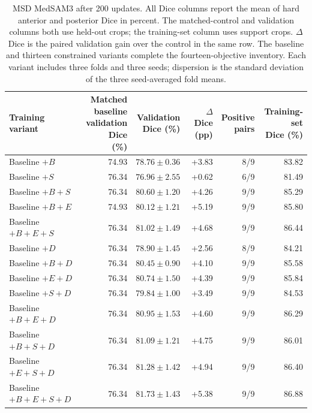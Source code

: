 \documentclass[12pt,a4paper]{article}
\begin{document}
\FloatBarrier
\begin{table}[htbp]
\centering\footnotesize{}
\setlength{\tabcolsep}{4pt}
\renewcommand{\arraystretch}{1.15}
\begin{tabular}{@{}lrrrrr@{}}
\hline
\shortstack{Training\\variant} & \shortstack{Matched baseline\\validation Dice\\(\%)} & \shortstack{Validation\\Dice (\%)} & \shortstack{$\Delta$ Dice\\(pp)} & \shortstack{Positive\\pairs} & \shortstack{Training-set\\Dice (\%)} \\
\hline
Baseline $+B$ & 74.93 & $78.76\pm0.36$ & +3.83 & 8/9 & 83.82 \\
Baseline $+S$ & 76.34 & $76.96\pm2.55$ & +0.62 & 6/9 & 81.49 \\
Baseline $+B+S$ & 76.34 & $80.60\pm1.20$ & +4.26 & 9/9 & 85.29 \\
Baseline $+B+E$ & 74.93 & $80.12\pm1.21$ & +5.19 & 9/9 & 85.80 \\
Baseline $+B+E+S$ & 76.34 & $81.02\pm1.49$ & +4.68 & 9/9 & 86.44 \\
Baseline $+D$ & 76.34 & $78.90\pm1.45$ & +2.56 & 8/9 & 84.21 \\
Baseline $+B+D$ & 76.34 & $80.45\pm0.90$ & +4.10 & 9/9 & 85.58 \\
Baseline $+E+D$ & 76.34 & $80.74\pm1.50$ & +4.39 & 9/9 & 85.84 \\
Baseline $+S+D$ & 76.34 & $79.84\pm1.00$ & +3.49 & 9/9 & 84.53 \\
Baseline $+B+E+D$ & 76.34 & $80.95\pm1.53$ & +4.60 & 9/9 & 86.29 \\
Baseline $+B+S+D$ & 76.34 & $81.09\pm1.21$ & +4.75 & 9/9 & 86.01 \\
Baseline $+E+S+D$ & 76.34 & $81.28\pm1.42$ & +4.94 & 9/9 & 86.40 \\
Baseline $+B+E+S+D$ & 76.34 & $81.73\pm1.43$ & +5.38 & 9/9 & 86.88 \\
\hline
\end{tabular}
\caption{MSD MedSAM3 after 200 updates. All Dice columns report the
mean of hard anterior and posterior Dice in percent. The matched-control
and validation columns both use held-out crops; the training-set column
uses support crops. $\Delta$ Dice is the paired validation gain over the
control in the same row. The baseline and thirteen constrained variants
complete the fourteen-objective inventory. Each variant includes three
folds and three seeds; dispersion is the standard deviation of the
three seed-averaged fold means.}
\label{tab:medsam-msd-noaug}
\label{tab:medsam-msd-original-noaug}
\end{table}
\end{document}
